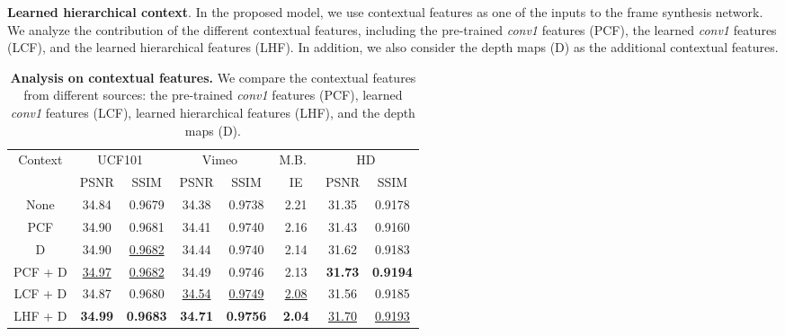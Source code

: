 \documentclass[10pt,twocolumn,letterpaper]{article}
\newcommand{\Paragraph}[1]{{\vspace{-2mm}\flushleft\textbf{#1}}} \newcommand{\ul}[1]{\underline{\smash{#1}}}
\def\red#1{\textcolor{MyRed}{#1}}
\def\blue#1{\textcolor{MyBlue}{#1}}
\def\first#1{\red{\textbf{#1}}}
\def\second#1{\blue{\underline{#1}}}
\begin{document}
	
	\Paragraph{Learned hierarchical context}.
In the proposed model, we use contextual features as one of the inputs to the frame synthesis network.
We analyze the contribution of the different contextual features, including the pre-trained \textit{conv1} features (PCF), the learned \textit{conv1} features (LCF), and the learned hierarchical features (LHF).
In addition, we also consider the depth maps (D) as the additional contextual features.
	
	
	\begin{table}
	\caption{
		\textbf{Analysis on contextual features.}
We compare the contextual features from different sources: the pre-trained \textit{conv1} features (PCF), learned \textit{conv1} features (LCF), learned hierarchical features (LHF), and the depth maps (D).
	}
	\vspace{-5pt}
	\label{tab:context_ablation}
	\footnotesize
	\renewcommand{\tabcolsep}{3pt} \centering
	\begin{tabular}{cccccccc}
		\toprule
		\multirow{2}{*}[-0.28em]{Context} &
		\multicolumn{2}{c}{UCF101~\cite{soomro2012ucf101}} &
		\multicolumn{2}{c}{Vimeo~\cite{xue2017video}} &
		M.B.~\cite{baker2011database} &
		\multicolumn{2}{c}{HD~\cite{bao2018MEMC-Net}}
		\\
\cmidrule(l{2pt}r{1pt}){2-3}
		\cmidrule(l{2pt}r{1pt}){4-5} 
		\cmidrule(l{2pt}r{1pt}){6-6}
		\cmidrule(l{2pt}r{1pt}){7-8}
		
&PSNR & SSIM 	&PSNR & SSIM	& 
		IE &PSNR & SSIM \\
		\addlinespace[-1pt]
		\midrule
		
		None &34.84 & 0.9679 & 34.38 &0.9738 & 2.21 & 31.35 & 0.9178 \\
		
PCF
		&{34.90} & 0.9681 & 34.41 &0.9740 & 2.16 & 31.43 & 0.9160 \\
		
D
		&{34.90}  &\second{0.9682} &34.44 &0.9740 &  2.14 &31.62 & 0.9183\\ 
		
PCF + D
		&\second{34.97} & \second{0.9682} &34.49 & 0.9746 & 2.13 &\first{31.73}  & \first{0.9194}\\	
		
LCF + D
		& 34.87 & 0.9680 & \second{34.54} &  \second{0.9749} & \second{2.08} & 31.56  & 0.9185 \\	 
		
LHF + D
		&\first{34.99}  &  \first{0.9683} & \first{34.71} &\first{0.9756} & \first{2.04} & \second{31.70} & \second{0.9193}\\		
		\bottomrule
	\end{tabular} 	
\end{table}
\end{document}
